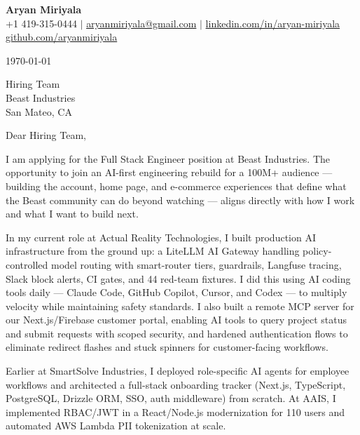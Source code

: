 \documentclass[letterpaper,11pt]{article}
\begin{document}
\begin{center}
  {\LARGE \textbf{Aryan Miriyala}}\\[2pt]
  \small
  +1 419-315-0444 $|$ \href{mailto:aryanmiriyala@gmail.com}{aryanmiriyala@gmail.com} $|$ \href{https://www.linkedin.com/in/aryan-miriyala-7788a21b6/}{linkedin.com/in/aryan-miriyala}\\
  \href{https://github.com/aryanmiriyala}{github.com/aryanmiriyala}
\end{center}\vspace{12pt}

\today

\vspace{12pt}

Hiring Team\\
Beast Industries\\
San Mateo, CA

\vspace{12pt}

Dear Hiring Team,

\vspace{6pt}

I am applying for the Full Stack Engineer position at Beast Industries. The opportunity to join an AI-first engineering rebuild for a 100M+ audience — building the account, home page, and e-commerce experiences that define what the Beast community can do beyond watching — aligns directly with how I work and what I want to build next.

\vspace{6pt}

In my current role at Actual Reality Technologies, I built production AI infrastructure from the ground up: a LiteLLM AI Gateway handling policy-controlled model routing with smart-router tiers, guardrails, Langfuse tracing, Slack block alerts, CI gates, and 44 red-team fixtures. I did this using AI coding tools daily — Claude Code, GitHub Copilot, Cursor, and Codex — to multiply velocity while maintaining safety standards. I also built a remote MCP server for our Next.js/Firebase customer portal, enabling AI tools to query project status and submit requests with scoped security, and hardened authentication flows to eliminate redirect flashes and stuck spinners for customer-facing workflows.

\vspace{6pt}

Earlier at SmartSolve Industries, I deployed role-specific AI agents for employee workflows and architected a full-stack onboarding tracker (Next.js, TypeScript, PostgreSQL, Drizzle ORM, SSO, auth middleware) from scratch. At AAIS, I implemented RBAC/JWT in a React/Node.js modernization for 110 users and automated AWS Lambda PII tokenization at scale.
\end{document}
